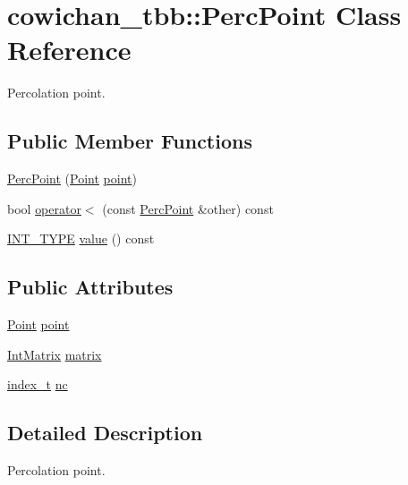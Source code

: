 \hypertarget{classcowichan__tbb_1_1_perc_point}{
\section{cowichan\_\-tbb::PercPoint Class Reference}
\label{classcowichan__tbb_1_1_perc_point}
}
Percolation point.  


\subsection*{Public Member Functions}
\begin{CompactItemize}
\item 
\hyperlink{classcowichan__tbb_1_1_perc_point_6181f073828abb43fd9db668c7954841}{PercPoint} (\hyperlink{class_point}{Point} \hyperlink{classcowichan__tbb_1_1_perc_point_42029c309350f2f2768c33ef608c24cd}{point})
\item 
bool \hyperlink{classcowichan__tbb_1_1_perc_point_f8e5cc2f3104c8aaf2183ef21ae78b6d}{operator$<$} (const \hyperlink{classcowichan__tbb_1_1_perc_point}{PercPoint} \&other) const 
\item 
\hyperlink{cowichan_8hpp_c96945095fd0ce7186a1d00a89f77d2c}{INT\_\-TYPE} \hyperlink{classcowichan__tbb_1_1_perc_point_53cad861ab94aac7d92a447b072a61f5}{value} () const 
\end{CompactItemize}
\subsection*{Public Attributes}
\begin{CompactItemize}
\item 
\hyperlink{class_point}{Point} \hyperlink{classcowichan__tbb_1_1_perc_point_42029c309350f2f2768c33ef608c24cd}{point}
\item 
\hyperlink{cowichan_8hpp_82321152ddeeefe9c61350a42ed9e7af}{IntMatrix} \hyperlink{classcowichan__tbb_1_1_perc_point_66cf1ffa25f7a83d6f36d3fa80148f8e}{matrix}
\item 
\hyperlink{cowichan_8hpp_5b04577d5d21124855deaad298595371}{index\_\-t} \hyperlink{classcowichan__tbb_1_1_perc_point_10b21f3ed373ae36976f42df52992b56}{nc}
\end{CompactItemize}


\subsection{Detailed Description}
Percolation point. 

